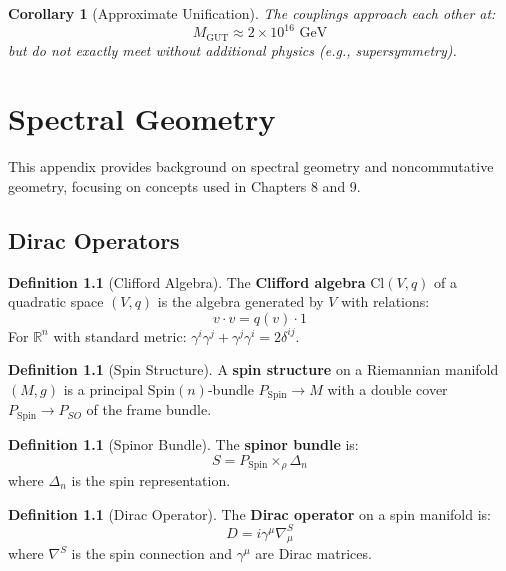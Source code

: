 \documentclass[11pt,a4paper,openright]{book}
\theoremstyle{plain}
\newtheorem{corollary}[theorem]{Corollary}
\theoremstyle{definition}
\newtheorem{definition}[theorem]{Definition}
\newcommand{\GUT}{\mathrm{GUT}}
\newcommand{\R}{\mathbb{R}}
\begin{document}
\begin{corollary}[Approximate Unification]
The couplings approach each other at:
\begin{equation}
M_{\GUT} \approx 2 \times 10^{16} \text{ GeV}
\end{equation}
but do not exactly meet without additional physics (e.g., supersymmetry).
\end{corollary}


\chapter{Spectral Geometry}
\label{app:spectral}

This appendix provides background on spectral geometry and noncommutative geometry, focusing on concepts used in Chapters 8 and 9.

\section{Dirac Operators}

\begin{definition}[Clifford Algebra]
The \textbf{Clifford algebra} $\mathrm{Cl}(V, q)$ of a quadratic space $(V, q)$ is the algebra generated by $V$ with relations:
\begin{equation}
v \cdot v = q(v) \cdot 1
\end{equation}
For $\R^n$ with standard metric: $\gamma^i \gamma^j + \gamma^j \gamma^i = 2\delta^{ij}$.
\end{definition}

\begin{definition}[Spin Structure]
A \textbf{spin structure} on a Riemannian manifold $(M, g)$ is a principal $\mathrm{Spin}(n)$-bundle $P_{\mathrm{Spin}} \to M$ with a double cover $P_{\mathrm{Spin}} \to P_{SO}$ of the frame bundle.
\end{definition}

\begin{definition}[Spinor Bundle]
The \textbf{spinor bundle} is:
\begin{equation}
S = P_{\mathrm{Spin}} \times_{\rho} \Delta_n
\end{equation}
where $\Delta_n$ is the spin representation.
\end{definition}

\begin{definition}[Dirac Operator]
The \textbf{Dirac operator} on a spin manifold is:
\begin{equation}
D = i\gamma^\mu \nabla_\mu^S
\end{equation}
where $\nabla^S$ is the spin connection and $\gamma^\mu$ are Dirac matrices.
\end{definition}
\end{document}
